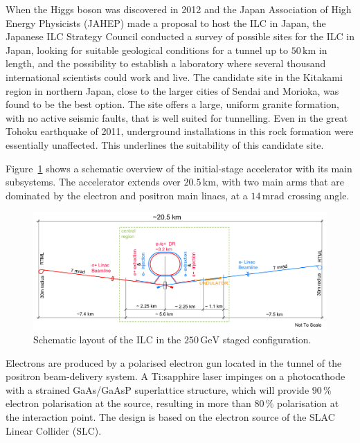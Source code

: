 \documentclass[%
 reprint,
 floatfix,
 amsmath,amssymb,
 aps,
]{revtex4-1}
\begin{document}
When the Higgs boson was discovered in 2012 and the Japan
 Association of High Energy Physicists (JAHEP) made a proposal to host the ILC in Japan,
the Japanese ILC Strategy Council conducted a survey of possible sites
for the ILC in Japan, looking for  suitable geological conditions
 for a tunnel up to $50\,{\mathrm{km}}$ in length, and the possibility to establish a
 laboratory where several thousand international scientists could  work and live. 
The candidate site in the Kitakami region in
 northern Japan, close to the larger cities of Sendai and Morioka, 
was found to be the best option. 
The site offers a large, uniform granite formation, 
with no active seismic faults, that is well suited for tunnelling.
Even in the great Tohoku earthquake of 2011,  underground installations
in this rock formation were essentially unaffected. This  underlines
 the suitability of this candidate site. 

Figure~\ref{fig_ilc-schematic} shows a schematic overview of the
initial-stage 
accelerator with its main subsystems.
The accelerator extends over $20.5\,{\mathrm{km}}$, with two main arms that are dominated by the electron and positron main linacs, at a $14\,{\mathrm{mrad}}$ crossing angle.

 \begin{figure}[tb]
 \begin{center}
 \includegraphics[width=\hsize]{figures/TDR-machine-layout-cartoon-staged-mirror.pdf}
\caption{Schematic layout of the ILC
 in the $250\,{\mathrm{GeV}}$ staged configuration.
\label{fig_ilc-schematic}}
 \end{center}
 \vspace{-0.7cm}
 \end{figure}

Electrons are produced by a polarised electron gun located in the
tunnel of the positron beam-delivery system. A Ti:sapphire laser
impinges on a photocathode with a strained GaAs/GaAsP superlattice
structure, which will provide  $90\,\%$ electron polarisation at the
source, resulting in more than $80\,\%$ polarisation at the interaction
point. The design is based on the electron source of the SLAC
Linear Collider (SLC). 
\end{document}
